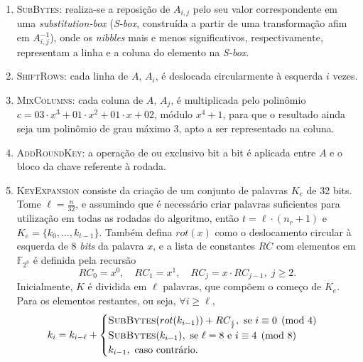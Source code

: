 \documentclass[12pt,notitlepage]{report}
\begin{document}
\begin{enumerate}[label=\roman*.]

  \item \textsc{SubBytes}: realiza-se a reposição de $A_{i,j}$ pelo seu valor
      correspondente em uma \emph{substitution-box} (\emph{S-box}, construída a
        partir de uma transformação afim em $A_{i,j}^{-1}$),
        onde os \emph{nibbles} mais e menos significativos,
        respectivamente, representam a linha e a coluna do elemento na
        \emph{S-box}.

  \item \textsc{ShiftRows}: cada linha de $A$, $A_i$, é deslocada circularmente
      à esquerda $i$ vezes.

  \item \textsc{MixColumns}: cada coluna de $A$, $A_j$, é multiplicada pelo
      polinômio $c = 03 \cdot x^{3} + 01 \cdot x^{2} + 01 \cdot x + 02$, módulo
        $x^{4} + 1$, para que o resultado ainda seja um polinômio de grau
        máximo 3, apto a ser representado na coluna.

  \item \textsc{AddRoundKey}: a operação de ou exclusivo bit a bit é aplicada
      entre $A$ e o bloco da chave referente à rodada.

  \item \textsc{KeyExpansion} consiste da criação de um conjunto de palavras $K_e$ de
32 bits.  Tome $\ell = \frac{n}{32}$, e assumindo que é necessário criar
palavras suficientes para utilização em todas as rodadas do algoritmo, então $t
= \ell \cdot (n_r + 1)$ e $K_e = \{k_0, \dots, k_{t - 1}\}$. Também defina
$rot(x)$ como o deslocamento circular à esquerda de 8 \emph{bits} da palavra $x$, e a
lista de constantes $RC$ com elementos em $\mathbb{F}_{2^{8}}$ é definida pela
recursão
\begin{equation}
RC_0 = x^0, \quad RC_1 = x^1, \quad RC_j = x \cdot RC_{j-1}, \; j \geq 2.
\end{equation}
Inicialmente, $K$ é dividida em $\ell$ palavras, que compõem o começo de $K_e$.
Para os elementos restantes, ou seja, $\forall i \geq \ell$,
\begin{equation}
  k_{i} = k_{i - \ell} +
    \begin{cases}
      \textsc{SubBytes}(rot(k_{i - 1})) + RC_{\frac{i}{\ell}},
        \text{ se } i \equiv 0 \pmod{4} \\
      \textsc{SubBytes}(k_{i - 1}),
        \text{ se } \ell = 8 \text { e } i \equiv 4 \pmod{8} \\
      k_{i - 1}, \text{ caso contrário.}
    \end{cases}
\end{equation}
\end{enumerate}
\end{document}
